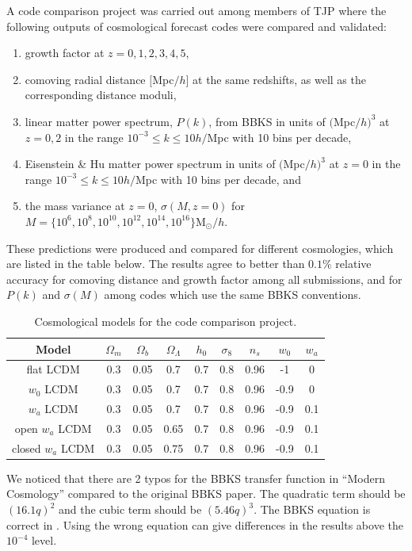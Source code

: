 \documentclass[\docopts]{\docclass}
\begin{document}
A code comparison project was carried out among members of TJP where the following outputs of cosmological forecast codes were compared and validated:
\begin{enumerate}
\item growth factor at $z = 0,1,2,3,4,5$,
\item comoving radial distance $[$Mpc$/h]$ at the same redshifts, as well as the corresponding distance moduli,
\item linear matter power spectrum, $P(k)$, from BBKS \citep{BBKS} in units of $($Mpc$/h)^3$ at $z=0,2$ in the range $10^{-3} \leq k \leq 10 h/$Mpc with 10 bins per decade,
\item Eisenstein \& Hu matter power spectrum in units of $($Mpc$/h)^3$ at $z=0$ in the range $10^{-3} \leq k \leq 10 h/$Mpc with 10 bins per decade, and
\item the mass variance at $z=0$, $\sigma(M,z=0)$ for $M =\{10^6, 10^8, 10^{10}, 10^{12}, 10^{14}, 10^{16}\} $M$_\odot/h$.
\end{enumerate}
These predictions were produced and compared for different cosmologies, which are listed in the table below. The results agree to better than $0.1\%$ relative accuracy for comoving distance and growth factor among all submissions, and for $P(k)$ and $\sigma(M)$ among codes which use the same BBKS conventions.

\begin{table}
\begin{center}
  \begin{tabular}{ c | c c c c c c c c }
    \hline
    \hline
    Model & $\Omega_m$ & $\Omega_b$ & $\Omega_\Lambda$ & $h_0$ & $\sigma_8$ & $n_s$ & $w_0$ & $w_a$ \\
    \hline
    flat LCDM & 0.3 & 0.05 & 0.7 & 0.7 & 0.8 & 0.96 & -1 & 0 \\
    $w_0$ LCDM & 0.3 & 0.05 & 0.7 & 0.7 & 0.8 & 0.96 & -0.9 & 0  \\
    $w_a$ LCDM & 0.3 & 0.05 & 0.7 & 0.7 & 0.8 & 0.96 & -0.9 & 0.1  \\
    open $w_a$ LCDM & 0.3 & 0.05 & 0.65 & 0.7 & 0.8 & 0.96 & -0.9 & 0.1  \\
    closed $w_a$ LCDM & 0.3 & 0.05 & 0.75 & 0.7 & 0.8 & 0.96 & -0.9 & 0.1  \\
    \hline
	\end{tabular}
	\caption{Cosmological models for the code comparison project.}
    \label{table:code_comp}
\end{center}
\end{table}
We noticed that there are 2 typos for the BBKS transfer function in ``Modern Cosmology'' \citep{DodelsonBook} compared to the original BBKS paper. The quadratic term should be $(16.1q)^2$ and the cubic term should be $(5.46q)^3$. The BBKS equation is correct in \citet{PeacockBook}. Using the wrong equation can give differences in the results above the $10^{-4}$ level.
\end{document}
